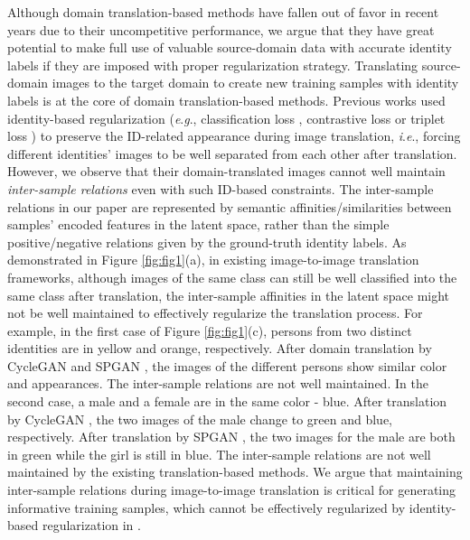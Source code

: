 \documentclass[journal]{IEEEtran}
\newcommand{\ie}{\textit{i}.\textit{e}., }
\newcommand{\eg}{\textit{e}.\textit{g}., }
\begin{document}
Although domain translation-based methods have fallen out of favor in recent years due to their uncompetitive performance,
we argue that they have great potential to make full use of valuable source-domain data with accurate identity labels if they are imposed with proper regularization strategy.
Translating source-domain images to the target domain to create new training samples with identity labels is at the core of domain translation-based methods.
Previous works used identity-based regularization (\eg classification loss \cite{deng2018similarity,chen2019instance,zou2020joint}, contrastive loss \cite{deng2018image} or triplet loss \cite{tang2020cgan}) to preserve the ID-related appearance during image translation,
{\ie forcing different identities' images to be well separated from each other after translation.}
However, we observe that their domain-translated images cannot well maintain \emph{inter-sample relations} even with such ID-based constraints.
{The inter-sample relations in our paper are represented by semantic affinities/similarities between samples' encoded features in the latent space, rather than the simple positive/negative relations given by the ground-truth identity labels.}
 {As demonstrated in Figure \ref{fig:fig1}(a), in existing image-to-image translation frameworks, although images of the same class can still be well classified into the same class after translation, the inter-sample affinities in the latent space might not be well maintained to effectively regularize the translation process.}
 {For example, in the first case of Figure \ref{fig:fig1}(c), persons from two distinct identities are in yellow and orange, respectively. After domain translation by CycleGAN \cite{zhu2017unpaired} and SPGAN \cite{deng2018image}, the images of the different persons show similar color and appearances. The inter-sample relations are not well maintained.
In the second case, a male and a female are in the same color - blue. After translation by CycleGAN \cite{zhu2017unpaired}, the two images of the male change to green and blue, respectively.
After translation by SPGAN \cite{deng2018image},  the two images for the male are both in green while the girl is still in blue.
The inter-sample relations are not well maintained by the existing translation-based methods.}
{We argue that maintaining inter-sample relations during image-to-image translation is critical for generating informative training samples, which cannot be effectively regularized by identity-based regularization in \cite{deng2018similarity,chen2019instance,zou2020joint,deng2018image,tang2020cgan}.}
\end{document}
